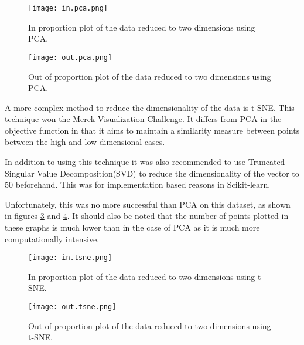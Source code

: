 \begin{figure}
    \texttt{[image: in.pca.png]}
    \centering
    \caption{In proportion plot of the data reduced to two dimensions using PCA.}
    \label{fig:inpca}
\end{figure}

\begin{figure}
    \texttt{[image: out.pca.png]}
    \centering
    \caption{Out of proportion plot of the data reduced to two dimensions using PCA.}
    \label{fig:outpca}
\end{figure}


A more complex method to reduce the dimensionality of the data is t-SNE\autocite{van_der_maaten_visualizing_2008}.
This technique won the Merck Visualization Challenge.
It differs from PCA in the objective function in that it aims to maintain a similarity measure between points between the high and low-dimensional cases.

In addition to using this technique it was also recommended to use Truncated Singular Value Decomposition(SVD) to reduce the dimensionality of the vector to 50 beforehand.
This was for implementation based reasons in Scikit-learn.

Unfortunately, this was no more successful than PCA on this dataset, as shown in figures \ref{fig:intsne} and \ref{fig:outtsne}.
It should also be noted that the number of points plotted in these graphs is much lower than in the case of PCA as it is much more computationally intensive.

\begin{figure}
    \texttt{[image: in.tsne.png]}
    \centering
    \caption{In proportion plot of the data reduced to two dimensions using t-SNE.}
    \label{fig:intsne}
\end{figure}

\begin{figure}
    \texttt{[image: out.tsne.png]}
    \centering
    \caption{Out of proportion plot of the data reduced to two dimensions using t-SNE.}
    \label{fig:outtsne}
\end{figure}

